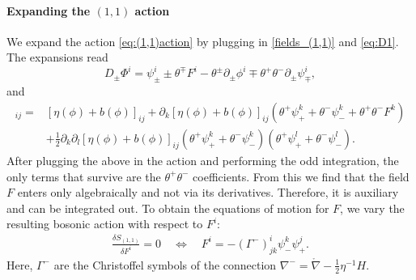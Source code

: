 \documentclass[letterpaper,12pt]{article}
\newcommand{\lc}{\mathring{\n}}
\newcommand{\p}{\partial}
\newcommand{\n}{\nabla}
\theoremstyle{definition}
\theoremstyle{remark}
\theoremstyle{examples}
\begin{document}
\paragraph{Expanding the $(1,1)$ action}
We expand the action \eqref{eq:(1,1)action} by plugging in \eqref{fields_(1,1)} and \eqref{eq:D1}. The expansions read
\[
D_\pm\Phi^i =\psi^i_\pm\pm\theta^\mp F^i-\theta^\pm\p_\pm\phi^i\mp\theta^+\theta^-\p_\pm\psi^i_\mp,
\]
and
\begin{align*}
[\eta(\Phi)+b(\Phi)]_{ij} = & [\eta(\phi)+b(\phi)]_{ij}+\p_k[\eta(\phi)+b(\phi)]_{ij}(\theta^+\psi_+^k+\theta^-\psi_-^k+\theta^+\theta^-F^k)\\
& +\frac{1}{2}\p_k\p_l[\eta(\phi)+b(\phi)]_{ij}(\theta^+\psi_+^k+\theta^-\psi_-^k)(\theta^+\psi_+^l+\theta^-\psi_-^l).
\end{align*}
After plugging the above in the action and performing the odd integration, the only terms that survive are the $\theta^+\theta^-$ coefficients. From this we find that
the field $F$ enters only algebraically and not via its derivatives. Therefore, it is auxiliary and can be integrated out. To obtain the equations of motion for $F$,
we vary the resulting bosonic action with respect to $F^i$:
\begin{align} \label{F_EoM}
\frac{\delta S_{(1,1)}}{\delta F^i}=0\quad \Longleftrightarrow\quad  F^i=-(\Gamma^-)^i_{jk}\psi^k_-\psi^j_+.
\end{align}
Here, $\Gamma^-$ are the Christoffel symbols of the connection $\n^-=\lc-\frac{1}{2}\eta^{-1}H$.
\end{document}
